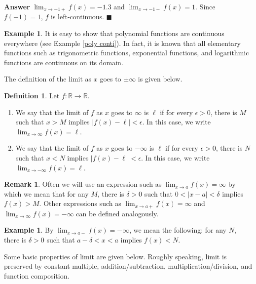 \documentclass[12pt,letterpaper]{book}
\numberwithin{equation}{section}
\theoremstyle{definition}
\newtheorem{defi}[thm]{\textbf{Definition}}
\newtheorem{example}[thm]{\textbf{Example}}
\newtheorem{remark}[thm]{\textbf{Remark}}
\newenvironment{answer}{\noindent\textbf{Answer}}{\hfill$\blacksquare$\vspace{0.1in}}
\begin{document}
\begin{answer}
$\displaystyle{\lim_{x\to -1+}f(x)=-1.3}$ and $\displaystyle{\lim_{x\to -1-}f(x)=1}$. Since $f(-1)=1$, $f$ is left-continuous.
\end{answer}

\begin{example}
It is easy to show that polynomial functions are continuous everywhere (see Example \ref{poly conti}). In fact, it is known that all elementary functions such as trigonometric functions, exponential functions, and logarithmic functions are continuous on its domain.
\end{example}

The definition of the limit as $x$ goes to $\pm\infty$ is given below.

\begin{defi}\label{lim at inf} Let $f:\mathbb{R}\to \mathbb{R}$.
\begin{enumerate}
\item We say that the limit of $f$ as $x$ goes to $\infty$ is $\ell$ if for every $\epsilon>0$, there is $M$ such that
$x>M$ implies $|f(x)-\ell|<\epsilon$. In this case, we write $\displaystyle{\lim_{x\to \infty} f(x)=\ell}$.
\item We say that the limit of $f$ as $x$ goes to $-\infty$ is $\ell$ if for every $\epsilon>0$, there is $N$ such that
$x<N$ implies $|f(x)-\ell|<\epsilon$. In this case, we write $\displaystyle{\lim_{x\to -\infty} f(x)=\ell}$.
\end{enumerate}
\end{defi}

\begin{remark}\label{inf as limit}
Often we will use an expression such as $\displaystyle{\lim_{x\to a} f(x)=\infty}$ by which we mean that for any $M$, there is $\delta>0$ such that $0<|x-a|<\delta$ implies $f(x)>M$. Other expressions such as $\displaystyle{\lim_{x\to a+} f(x)=\infty}$ and  $\displaystyle{\lim_{x\to \infty} f(x)=-\infty}$ can be defined analogously.
\end{remark}

\begin{example}
By $\displaystyle{\lim_{x\to a-} f(x)=-\infty}$, we mean the following: for any $N$, there is $\delta>0$ such that $a-\delta<x<a$ implies $f(x)<N$.
\end{example}

Some basic properties of limit are given below. Roughly speaking, limit is preserved by constant multiple, addition/subtraction, multiplication/division, and function composition.
\end{document}
